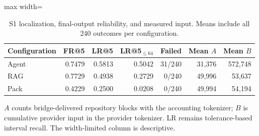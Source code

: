 \begin{table}[t]
\centering
\caption{S1 localization, final-output reliability, and measured input. Means include all 240 outcomes per configuration.}\label{tab:overview}
\small
\begin{adjustbox}{max width=\textwidth}\begin{tabular}{lrrrrrr}
\toprule
Configuration & FR@5 & LR@5 & LR@5$_{\leq64}$ & Failed & Mean $A$ & Mean $B$ \\
\midrule
Agent & 0.7479 & 0.5813 & 0.5042 & 31/240 & 31,376 & 572,748 \\
RAG & 0.7729 & 0.4938 & 0.2729 & 0/240 & 49,996 & 53,637 \\
Pack & 0.4229 & 0.2500 & 0.0208 & 0/240 & 49,994 & 54,194 \\
\bottomrule
\end{tabular}\end{adjustbox}
\par\vspace{3pt}\begin{minipage}{\textwidth}\footnotesize $A$ counts bridge-delivered repository blocks with the accounting tokenizer; $B$ is cumulative provider input in the provider tokenizer. LR remains tolerance-based interval recall. The width-limited column is descriptive.\end{minipage}
\end{table}
